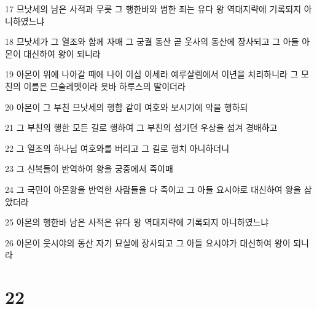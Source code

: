 \par 17 므낫세의 남은 사적과 무릇 그 행한바와 범한 죄는 유다 왕 역대지략에 기록되지 아니하였느냐
\par 18 므낫세가 그 열조와 함께 자매 그 궁궐 동산 곧 웃사의 동산에 장사되고 그 아들 아몬이 대신하여 왕이 되니라
\par 19 아몬이 위에 나아갈 때에 나이 이십 이세라 예루살렘에서 이년을 치리하니라 그 모친의 이름은 므술레멧이라 욧바 하루스의 딸이더라
\par 20 아몬이 그 부친 므낫세의 행함 같이 여호와 보시기에 악을 행하되
\par 21 그 부친의 행한 모든 길로 행하여 그 부친의 섬기던 우상을 섬겨 경배하고
\par 22 그 열조의 하나님 여호와를 버리고 그 길로 행치 아니하더니
\par 23 그 신복들이 반역하여 왕을 궁중에서 죽이매
\par 24 그 국민이 아몬왕을 반역한 사람들을 다 죽이고 그 아들 요시야로 대신하여 왕을 삼았더라
\par 25 아몬의 행한바 남은 사적은 유다 왕 역대지략에 기록되지 아니하였느냐
\par 26 아몬이 웃시야의 동산 자기 묘실에 장사되고 그 아들 요시야가 대신하여 왕이 되니라

\chapter{22}

